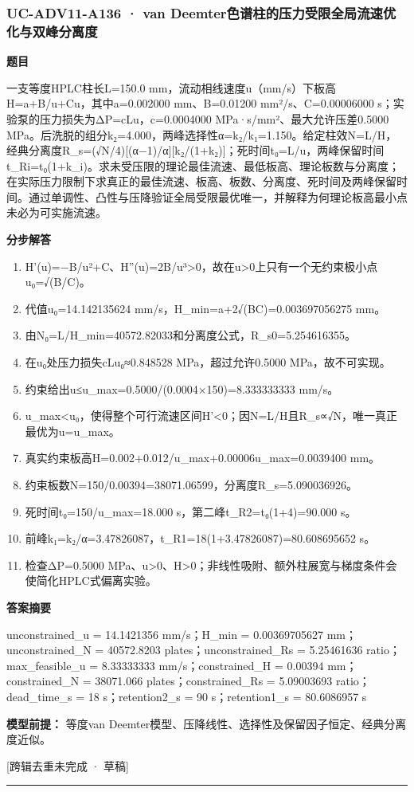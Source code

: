 \documentclass[UTF8,11pt,a4paper]{ctexart}
\begin{document}
\subsubsection*{UC-ADV11-A136 · van Deemter色谱柱的压力受限全局流速优化与双峰分离度}
\noindent\textbf{题目}\par
一支等度HPLC柱长L=150.0 mm，流动相线速度u（mm/s）下板高H=a+B/u+Cu，其中a=0.002000 mm、B=0.01200 mm²/s、C=0.00006000 s；实验泵的压力损失为ΔP=cLu，c=0.0004000 MPa·s/mm²、最大允许压差0.5000 MPa。后洗脱的组分k₂=4.000，两峰选择性α=k₂/k₁=1.150。给定柱效N=L/H，经典分离度R\_s=(√N/4)[(α−1)/α][k₂/(1+k₂)]；死时间t₀=L/u，两峰保留时间t\_Ri=t₀(1+k\_i)。求未受压限的理论最佳流速、最低板高、理论板数与分离度；在实际压力限制下求真正的最佳流速、板高、板数、分离度、死时间及两峰保留时间。通过单调性、凸性与压降验证全局受限最优唯一，并解释为何理论板高最小点未必为可实施流速。\par
\medskip\noindent\textbf{分步解答}
\begin{enumerate}
\item H'(u)=−B/u²+C、H''(u)=2B/u³>0，故在u>0上只有一个无约束极小点u₀=√(B/C)。
\item 代值u₀=14.142135624 mm/s，H\_min=a+2√(BC)=0.003697056275 mm。
\item 由N₀=L/H\_min=40572.82033和分离度公式，R\_s0=5.254616355。
\item 在u₀处压力损失cLu₀≈0.848528 MPa，超过允许0.5000 MPa，故不可实现。
\item 约束给出u≤u\_max=0.5000/(0.0004×150)=8.333333333 mm/s。
\item u\_max<u₀，使得整个可行流速区间H'<0；因N=L/H且R\_s∝√N，唯一真正最优为u=u\_max。
\item 真实约束板高H=0.002+0.012/u\_max+0.00006u\_max=0.0039400 mm。
\item 约束板数N=150/0.00394=38071.06599，分离度R\_s=5.090036926。
\item 死时间t₀=150/u\_max=18.000 s，第二峰t\_R2=t₀(1+4)=90.000 s。
\item 前峰k₁=k₂/α=3.47826087，t\_R1=18(1+3.47826087)=80.608695652 s。
\item 检查ΔP=0.5000 MPa、u>0、H>0；非线性吸附、额外柱展宽与梯度条件会使简化HPLC式偏离实验。
\end{enumerate}
\noindent\textbf{答案摘要}\par
unconstrained\_u = 14.1421356 mm/s；H\_min = 0.00369705627 mm；unconstrained\_N = 40572.8203 plates；unconstrained\_Rs = 5.25461636 ratio；max\_feasible\_u = 8.33333333 mm/s；constrained\_H = 0.00394 mm；constrained\_N = 38071.066 plates；constrained\_Rs = 5.09003693 ratio；dead\_time\_s = 18 s；retention2\_s = 90 s；retention1\_s = 80.6086957 s\par
\noindent\textbf{模型前提：}
等度van Deemter模型、压降线性、选择性及保留因子恒定、经典分离度近似。\par
\noindent\textcolor{red!65!black}{[跨辑去重未完成 · 草稿]} \par
\medskip\hrule\medskip
{}
\end{document}

